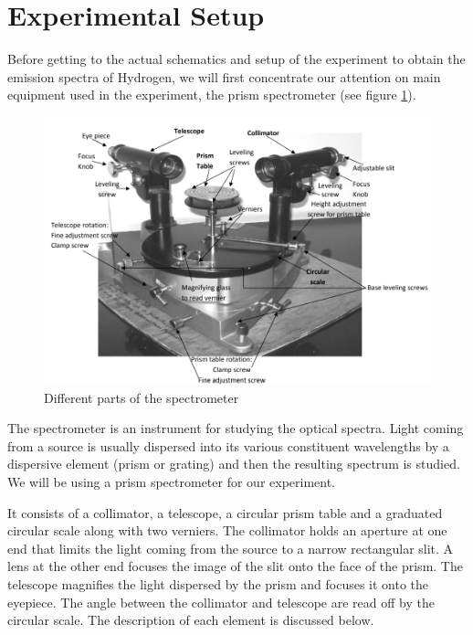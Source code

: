 \documentclass[%
 reprint,
 amsmath,amssymb,
 aps,
]{revtex4-2}
\begin{document}
\section{\label{sec:setup}Experimental Setup}
    Before getting to the actual schematics and setup of the experiment to obtain the emission spectra of Hydrogen, we will first concentrate our attention on main equipment used in the experiment, the prism spectrometer (see figure \ref{fig:spectrometer}).
    \begin{figure}
        \centering
        \includegraphics[scale = 0.42]{Figures/spectrometer.png}
        \caption{Different parts of the spectrometer}
        \label{fig:spectrometer}
    \end{figure}
    \par
    The spectrometer is an instrument for studying the optical spectra. Light coming from a source is usually dispersed into its various constituent wavelengths by a dispersive element (prism or grating) and then the resulting spectrum is studied. We will be using a prism spectrometer for our experiment.
    \par
    It consists of a collimator, a telescope, a circular prism table and a graduated circular scale along with two verniers. The collimator holds an aperture at one end that limits the light coming from the source to a narrow rectangular slit. A lens at the other end focuses the image of the slit onto the face of the prism. The telescope magnifies the light dispersed by the prism  and focuses it onto the eyepiece. The angle between the collimator and telescope are read off by the circular scale. The description of each element is discussed below.
\end{document}
